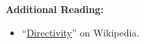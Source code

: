 
 
{\bf Additional Reading:}
\begin{itemize}
\item ``\href{https://en.wikipedia.org/wiki/Directivity}{Directivity}'' on Wikipedia.
\end{itemize}




